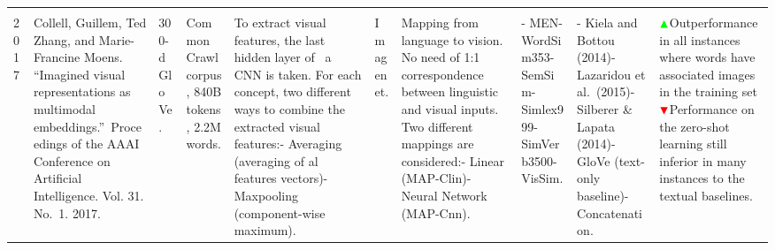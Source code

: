 \documentclass[
]{krantz}
\begin{document}
\begin{longtable}[]{@{}llllllllll@{}}
\begin{minipage}[t]{0.13\columnwidth}
\end{minipage}\tabularnewline
\begin{minipage}[t]{0.00\columnwidth}\raggedright
2017\strut
\end{minipage} & \begin{minipage}[t]{0.06\columnwidth}\raggedright
Collell, Guillem, Ted Zhang, and Marie-Francine Moens. ``Imagined visual representations as multimodal embeddings.''~Proceedings of the AAAI Conference on Artificial Intelligence. Vol. 31. No.~1. 2017.\strut
\end{minipage} & \begin{minipage}[t]{0.04\columnwidth}\raggedright
300-d GloVe.\strut
\end{minipage} & \begin{minipage}[t]{0.02\columnwidth}\raggedright
Common Crawl corpus, 840B tokens, 2.2M words.\strut
\end{minipage} & \begin{minipage}[t]{0.07\columnwidth}\raggedright
To extract visual features, the last hidden layer of~ a CNN is taken. For each concept, two different ways to combine the extracted visual features:- Averaging (averaging of al features vectors)- Maxpooling (component-wise maximum).\strut
\end{minipage} & \begin{minipage}[t]{0.05\columnwidth}\raggedright
Imagenet.\strut
\end{minipage} & \begin{minipage}[t]{0.25\columnwidth}\raggedright
Mapping from language to vision. No need of 1:1 correspondence between linguistic and visual inputs. Two different mappings are considered:- Linear (MAP-Clin)- Neural Network (MAP-Cnn).\strut
\end{minipage} & \begin{minipage}[t]{0.08\columnwidth}\raggedright
- MEN- WordSim353- SemSim- Simlex999-SimVerb3500- VisSim.\strut
\end{minipage} & \begin{minipage}[t]{0.05\columnwidth}\raggedright
- Kiela and Bottou (2014)- Lazaridou et al.~(2015)- Silberer \& Lapata (2014)- GloVe (text-only baseline)- Concatenation.\strut
\end{minipage} & \begin{minipage}[t]{0.13\columnwidth}\raggedright
\(\color{green}\blacktriangle\)Outperformance in all instances where words have associated images in the training set\(\color{red}\blacktriangledown\)Performance on the zero-shot learning still inferior in many instances to the textual baselines.\strut

\end{minipage}
\end{longtable}
\end{document}
